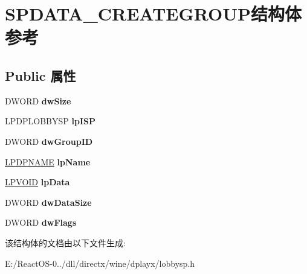 \hypertarget{struct_s_p_d_a_t_a___c_r_e_a_t_e_g_r_o_u_p}{}\section{S\+P\+D\+A\+T\+A\+\_\+\+C\+R\+E\+A\+T\+E\+G\+R\+O\+U\+P结构体 参考}
\label{struct_s_p_d_a_t_a___c_r_e_a_t_e_g_r_o_u_p}
\subsection*{Public 属性}
\begin{DoxyCompactItemize}
\item 
\mbox{\label{struct_s_p_d_a_t_a___c_r_e_a_t_e_g_r_o_u_p_a9f5a6d9d2f7d0af43f9e6b5d140dfc56}} 
D\+W\+O\+RD {\bfseries dw\+Size}
\item 
\mbox{\label{struct_s_p_d_a_t_a___c_r_e_a_t_e_g_r_o_u_p_af53d6630e580bd1b068e1881c4c7ff52}} 
L\+P\+D\+P\+L\+O\+B\+B\+Y\+SP {\bfseries lp\+I\+SP}
\item 
\mbox{\label{struct_s_p_d_a_t_a___c_r_e_a_t_e_g_r_o_u_p_a76ed15238728b8c6a367a5ca32a0436c}} 
D\+W\+O\+RD {\bfseries dw\+Group\+ID}
\item 
\mbox{\label{struct_s_p_d_a_t_a___c_r_e_a_t_e_g_r_o_u_p_a7b9c662d5a9e207ee2b2447a8d8bf502}} 
\hyperlink{structtag_d_p_n_a_m_e}{L\+P\+D\+P\+N\+A\+ME} {\bfseries lp\+Name}
\item 
\mbox{\label{struct_s_p_d_a_t_a___c_r_e_a_t_e_g_r_o_u_p_aa6bbf52abfd99d4200339e116b94d224}} 
\hyperlink{interfacevoid}{L\+P\+V\+O\+ID} {\bfseries lp\+Data}
\item 
\mbox{\label{struct_s_p_d_a_t_a___c_r_e_a_t_e_g_r_o_u_p_a27a4e58104882949bf8e18e21c19de31}} 
D\+W\+O\+RD {\bfseries dw\+Data\+Size}
\item 
\mbox{\label{struct_s_p_d_a_t_a___c_r_e_a_t_e_g_r_o_u_p_acb0357f8359681a307b20493727a78d3}} 
D\+W\+O\+RD {\bfseries dw\+Flags}
\end{DoxyCompactItemize}


该结构体的文档由以下文件生成\+:\begin{DoxyCompactItemize}
\item 
E\+:/\+React\+O\+S-\/0../dll/directx/wine/dplayx/lobbysp.\+h\end{DoxyCompactItemize}
